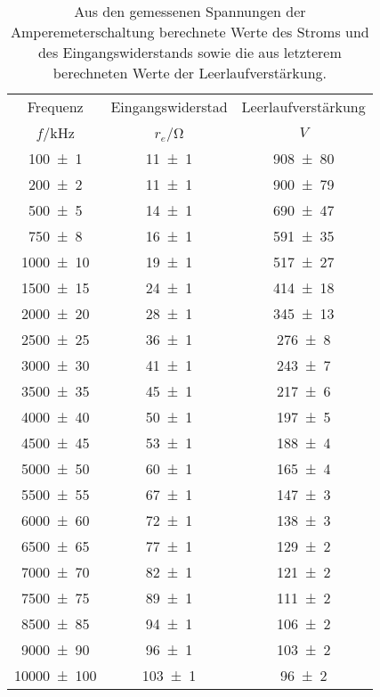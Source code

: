 \begin{table}[!h]
	\centering
	\begin{tabular}{ccc}
		\toprule
		Frequenz & Eingangswiderstad & Leerlaufverstärkung\\
		$f$/\si{\kilo\hertz} & $r_e$/\si{\ohm} & $V$\\
\midrule
		\num{100(1)} & \num{11(1)} & \num{908(80)}\\
		\num{200(2)} & \num{11(1)} & \num{900(79)}\\
		\num{500(5)} & \num{14(1)} & \num{690(47)}\\
		\num{750(8)} & \num{16(1)} & \num{591(35)}\\
		\num{1000(10)} & \num{19(1)} & \num{517(27)}\\
		\num{1500(15)} & \num{24(1)} & \num{414(18)}\\
		\num{2000(20)} & \num{28(1)} & \num{345(13)}\\
		\num{2500(25)} & \num{36(1)} & \num{276(8)}\\
		\num{3000(30)} & \num{41(1)} & \num{243(7)}\\
		\num{3500(35)} & \num{45(1)} & \num{217(6)}\\
		\num{4000(40)} & \num{50(1)} & \num{197(5)}\\
		\num{4500(45)} & \num{53(1)} & \num{188(4)}\\
		\num{5000(50)} & \num{60(1)} & \num{165(4)}\\
		\num{5500(55)} & \num{67(1)} & \num{147(3)}\\
		\num{6000(60)} & \num{72(1)} & \num{138(3)}\\
		\num{6500(65)} & \num{77(1)} & \num{129(2)}\\
		\num{7000(70)} & \num{82(1)} & \num{121(2)}\\
		\num{7500(75)} & \num{89(1)} & \num{111(2)}\\
		\num{8500(85)} & \num{94(1)} & \num{106(2)}\\
		\num{9000(90)} & \num{96(1)} & \num{103(2)}\\
		\num{10000(100)} & \num{103(1)} & \num{96(2)}\\
		\bottomrule
	\end{tabular}
	\caption{ Aus den gemessenen Spannungen der Amperemeterschaltung berechnete Werte des Stroms und des Eingangswiderstands
sowie die aus letzterem berechneten Werte der Leerlaufverstärkung. \label{tab:amperemeter_2}}
\end{table}
